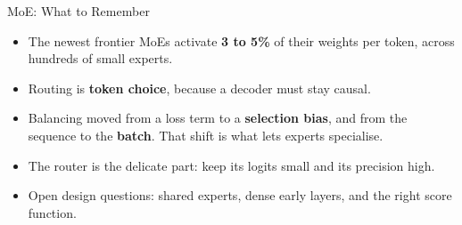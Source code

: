 \begin{frame}{MoE: What to Remember}
    \begin{itemize}\itemsep0.6em
        \item The newest frontier MoEs activate \textbf{3 to 5\%} of their weights per token, across hundreds of small experts.
        \item Routing is \textbf{token choice}, because a decoder must stay causal.
        \item Balancing moved from a loss term to a \textbf{selection bias}, and from the sequence to the \textbf{batch}. That shift is what lets experts specialise.
        \item The router is the delicate part: keep its logits small and its precision high.
        \item Open design questions: shared experts, dense early layers, and the right score function.
    \end{itemize}
    \vspace{0.4em}
\end{frame}
